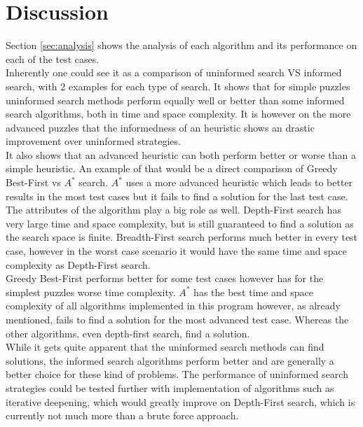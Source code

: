 \documentclass[journal]{IEEEtran}
\begin{document}
\section{Discussion}
Section \ref{sec:analysis} shows the analysis of each algorithm and its performance on each of the test cases. \\
Inherently one could see it as a comparison of uninformed search VS informed search, with 2 examples for each type of search. It shows that for simple puzzles uninformed search methods perform equally well or better than some informed search algorithms, both in time and space complexity. It is however on the more advanced puzzles that the informedness of an heuristic shows an drastic improvement over uninformed strategies. \\
It also shows that an advanced heuristic can both perform better or worse than a simple heuristic. An example of that would be a direct comparison of Greedy Best-First vs $A^*$ search. $A^*$ uses a more advanced heuristic which leads to better results in the most test cases but it fails to find a solution for the last test case. \\ 
 
The attributes of the algorithm play a big role as well. Depth-First search has very large time and space complexity, but is still guaranteed to find a solution as the search space is finite. Breadth-First search performs much better in every test case, however in the worst case scenario it would have the same time and space complexity as Depth-First search.\\ 
Greedy Best-First performs better for some test cases however has for the simplest puzzles worse time complexity. $A^*$ has the best time and space complexity of all algorithms implemented in this program however, as already mentioned, fails to find a solution for the most advanced test case. Whereas the other algorithms, even depth-first search, find a solution. \\

While it gets quite apparent that the uninformed search methods can find solutions, the informed search algorithms perform better and are generally a better choice for these kind of problems. The performance of uninformed search strategies could be tested further with implementation of algorithms such as iterative deepening, which would greatly improve on Depth-First search, which is currently not much more than a brute force approach.
\end{document}
